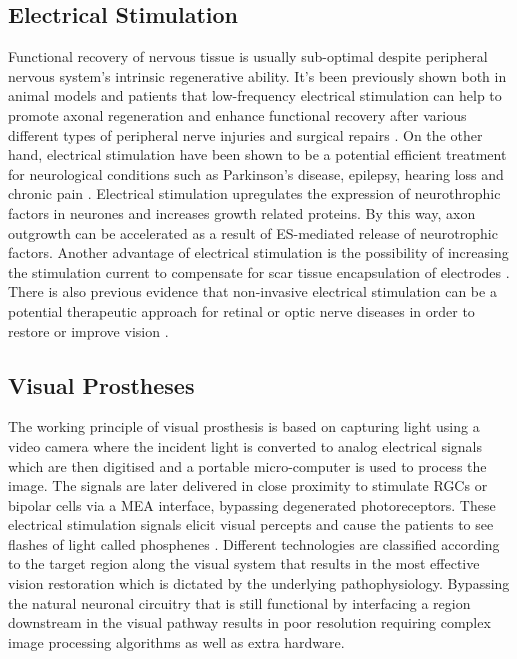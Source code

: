\subsection{Electrical Stimulation}
Functional recovery of nervous tissue is usually sub-optimal despite peripheral nervous system's intrinsic regenerative ability. It's been previously shown both in animal models and patients that low-frequency electrical stimulation can help to promote axonal regeneration and enhance functional recovery after various different types of peripheral nerve injuries and surgical repairs \cite{willand2016electrical}. On the other hand, electrical stimulation have been shown to be a potential efficient treatment for neurological conditions such as Parkinson's disease, epilepsy, hearing loss and chronic pain \cite{tybrandt2018high}. Electrical stimulation upregulates the expression of neurothrophic factors in neurones and increases growth related proteins. By this way, axon outgrowth can be accelerated as a result of ES-mediated release of neurotrophic factors. Another advantage of electrical stimulation is the possibility of increasing the stimulation current to compensate for scar tissue encapsulation of electrodes \cite{tybrandt2018high}. There is also previous evidence that non-invasive electrical stimulation can be a potential therapeutic approach for retinal or optic nerve diseases in order to restore or improve vision \cite{sehic2016electrical}.



\subsection{Visual Prostheses}

The working principle of visual prosthesis is based on capturing light using a video camera where the incident light is converted to analog electrical signals which are then digitised and a portable micro-computer is used to process the image. The signals are later delivered in close proximity to stimulate RGCs or bipolar cells via a MEA interface, bypassing degenerated photoreceptors. These electrical stimulation signals elicit visual percepts and cause the patients to see flashes of light called phosphenes \cite{narayan2018encyclopedia} \cite{farnum2020new}. Different technologies are classified according to the target region along the visual system that results in the most effective vision restoration which is dictated by the underlying pathophysiology. Bypassing the natural neuronal circuitry that is still functional by interfacing a region downstream in the visual pathway results in poor resolution requiring complex image processing algorithms as well as extra hardware. \cite{farnum2020new} 

